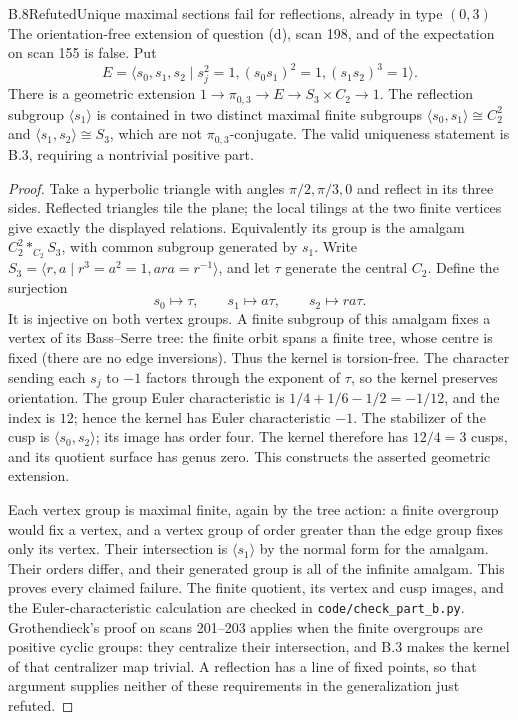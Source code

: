 \begin{claim}{B.8}{Refuted}{Unique maximal sections fail for reflections, already in type $(0,3)$}
The orientation-free extension of question (d), scan 198, and of the expectation
on scan 155 is false. Put
\[
 E=\langle s_0,s_1,s_2\mid s_j^2=1, (s_0s_1)^2=1, (s_1s_2)^3=1\rangle.
\]
There is a geometric extension $1\to\pi_{0,3}\to E\to S_3\times C_2\to1$.
The reflection subgroup $\langle s_1\rangle$ is contained in two distinct maximal
finite subgroups $\langle s_0,s_1\rangle\cong C_2^2$ and
$\langle s_1,s_2\rangle\cong S_3$, which are not $\pi_{0,3}$-conjugate.
The valid uniqueness statement is B.3, requiring a nontrivial positive part.
\end{claim}
\begin{proof}
Take a hyperbolic triangle with angles $\pi/2,\pi/3,0$ and reflect in its three
sides. Reflected triangles tile the plane; the local tilings at the two finite
vertices give exactly the displayed relations. Equivalently its group is the
amalgam $C_2^2*_{C_2}S_3$, with common subgroup generated by $s_1$.
Write $S_3=\langle r,a\mid r^3=a^2=1, ara=r^{-1}\rangle$, and let $\tau$ generate
the central $C_2$. Define the surjection
\[
 s_0\mapsto\tau,\qquad s_1\mapsto a\tau,\qquad s_2\mapsto ra\tau.
\]
It is injective on both vertex groups. A finite subgroup of this amalgam fixes
a vertex of its Bass--Serre tree: the finite orbit spans a finite tree, whose
centre is fixed (there are no edge inversions). Thus the kernel is torsion-free.
The character sending each $s_j$ to $-1$ factors through the exponent of $\tau$,
so the kernel preserves orientation. The group Euler characteristic is
$1/4+1/6-1/2=-1/12$, and the index is $12$; hence the kernel has Euler
characteristic $-1$. The stabilizer of the cusp is $\langle s_0,s_2\rangle$;
its image has order four. The kernel therefore has $12/4=3$ cusps, and its
quotient surface has genus zero. This constructs the asserted geometric extension.

Each vertex group is maximal finite, again by the tree action: a finite overgroup
would fix a vertex, and a vertex group of order greater than the edge group fixes
only its vertex. Their intersection is $\langle s_1\rangle$ by the normal form
for the amalgam. Their orders differ, and their generated group is all of the
infinite amalgam. This proves every claimed failure. The finite quotient, its
vertex and cusp images, and the Euler-characteristic calculation are checked in
\texttt{code/check\_part\_b.py}. Grothendieck's proof on scans 201--203 applies
when the finite overgroups are positive cyclic groups: they centralize their
intersection, and B.3 makes the kernel of that centralizer map trivial. A
reflection has a line of fixed points, so that argument supplies neither of
these requirements in the generalization just refuted.
\end{proof}

